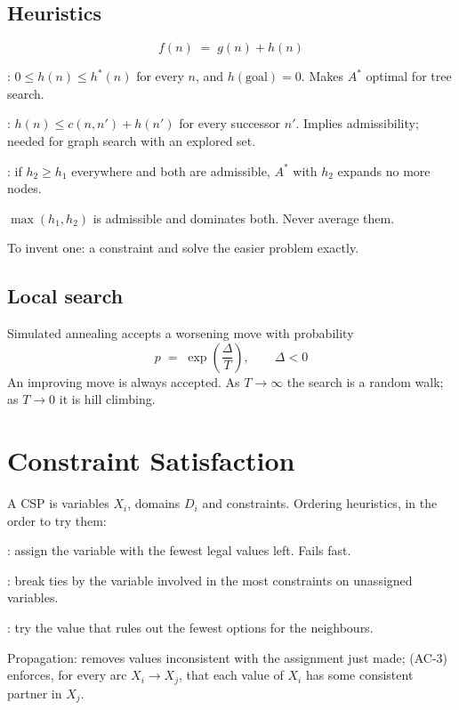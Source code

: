 \subsection*{Heuristics}

\[
  f(n) \;=\; g(n) + h(n)
\]
\begin{tight}
  \item {}: $0 \le h(n) \le h^{*}(n)$ for every $n$, and
        $h(\text{goal}) = 0$. Makes $A^{*}$ optimal for tree search.
  \item {}: $h(n) \le c(n,n') + h(n')$ for every successor $n'$.
        Implies admissibility; needed for graph search with an explored set.
  \item {}: if $h_{2} \ge h_{1}$ everywhere and both are admissible,
        $A^{*}$ with $h_{2}$ expands no more nodes.
  \item $\max(h_{1}, h_{2})$ is admissible and dominates both. Never average them.
  \item To invent one:  a constraint and solve the easier problem
        exactly.
\end{tight}

\subsection*{Local search}

Simulated annealing accepts a worsening move with probability
\[
  p \;=\; \exp\!\left(\frac{\Delta}{T}\right), \qquad \Delta < 0
\]
An improving move is always accepted. As $T \to \infty$ the search is a random
walk; as $T \to 0$ it is hill climbing.

\section{Constraint Satisfaction}

A CSP is variables $X_{i}$, domains $D_{i}$ and constraints. Ordering heuristics,
in the order to try them:
\begin{tight}
  \item {}: assign the variable with the fewest legal
        values left. Fails fast.
  \item {}: break ties by the variable involved in the most
        constraints on unassigned variables.
  \item {}: try the value that rules out the fewest
        options for the neighbours.
\end{tight}
Propagation:  removes values inconsistent with the
assignment just made;  (AC-3) enforces, for every arc
$X_{i} \to X_{j}$, that each value of $X_{i}$ has some consistent partner in
$X_{j}$.

